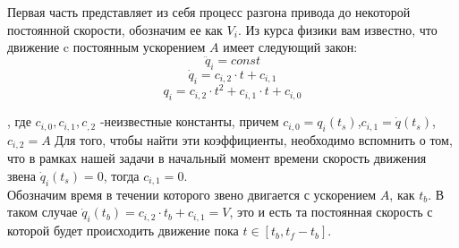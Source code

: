 Первая часть представляет из себя процесс разгона привода до некоторой постоянной скорости, обозначим ее как $V_i$.
Из курса физики вам известно, что движение c постоянным ускорением $A$ имеет следующий закон: 
$$
    \ddot{q}_i=const
$$
$$
    \dot{q}_i=c_{i,2}\cdot t+c_{i,1}
$$
$$
    q_i=c_{i,2}\cdot t^2+c_{i,1}\cdot t+c_{i,0}
$$

, где $c_{i,0}, c_{i,1}, c_{,2}$ -неизвестные константы, причем $c_{i,0}=q_i(t_s)$,$ c_{i,1}=\dot{q}(t_s)$,$ c_{i,2}=A$
Для того, чтобы найти эти коэффициенты,  необходимо вспомнить о том, что в рамках нашей задачи в начальный момент времени скорость движения звена $\dot{q}_i(t_s)=0$, тогда $c_{i,1}=0$.\\

Обозначим время в течении которого звено двигается с ускорением $A$, как $t_b$. В таком случае $\dot{q}_i(t_b)=c_{i,2}\cdot t_b+c_{i,1} = V$, это и есть та постоянная скорость с которой будет происходить движение пока $t\in[t_b,t_f-t_b]$.


 